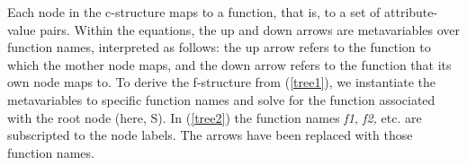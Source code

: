 \begin{exe}
  \label{tree1}
  \ex{}
\end{exe}

\noindent
Each node in the c-structure maps to a function, that is, to a set of attribute-value pairs.  Within the equations, the up and down arrows are metavariables over function names, interpreted as follows:  the up arrow refers to the function to which the mother node maps, and the down arrow refers to the function that its own node maps to.  To derive the f-structure from (\ref{tree1}), we instantiate the metavariables to specific function names and solve for the function associated with the root node (here, S).  In (\ref{tree2}) the function names \textit{f1, f2,} etc. are subscripted to the node labels.  The arrows have been replaced with those function names.  

